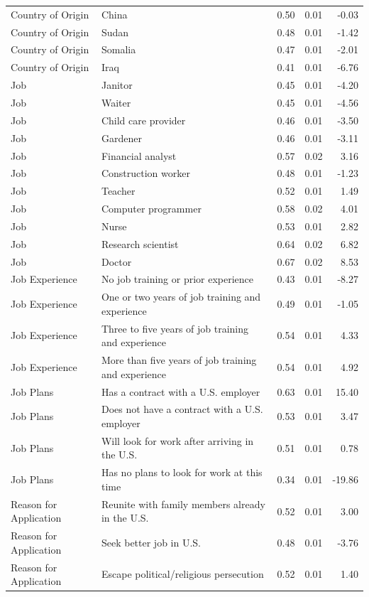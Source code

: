 \documentclass[a4paper,12pt]{article}\usepackage[]{graphicx}\usepackage[]{color}
\begin{document}
\begin{table}[ht]
\begin{tabular}{lp{3in}rrr}
  Country of Origin & China & 0.50 & 0.01 & -0.03 \\ 
  Country of Origin & Sudan & 0.48 & 0.01 & -1.42 \\ 
  Country of Origin & Somalia & 0.47 & 0.01 & -2.01 \\ 
  Country of Origin & Iraq & 0.41 & 0.01 & -6.76 \\ 
  Job & Janitor & 0.45 & 0.01 & -4.20 \\ 
  Job & Waiter & 0.45 & 0.01 & -4.56 \\ 
  Job & Child care provider & 0.46 & 0.01 & -3.50 \\ 
  Job & Gardener & 0.46 & 0.01 & -3.11 \\ 
  Job & Financial analyst & 0.57 & 0.02 & 3.16 \\ 
  Job & Construction worker & 0.48 & 0.01 & -1.23 \\ 
  Job & Teacher & 0.52 & 0.01 & 1.49 \\ 
  Job & Computer programmer & 0.58 & 0.02 & 4.01 \\ 
  Job & Nurse & 0.53 & 0.01 & 2.82 \\ 
  Job & Research scientist & 0.64 & 0.02 & 6.82 \\ 
  Job & Doctor & 0.67 & 0.02 & 8.53 \\ 
  Job Experience & No job training or prior experience & 0.43 & 0.01 & -8.27 \\ 
  Job Experience & One or two years of job training and experience & 0.49 & 0.01 & -1.05 \\ 
  Job Experience & Three to five years of job training and experience & 0.54 & 0.01 & 4.33 \\ 
  Job Experience & More than five years of job training and experience & 0.54 & 0.01 & 4.92 \\ 
  Job Plans & Has a contract with a U.S. employer & 0.63 & 0.01 & 15.40 \\ 
  Job Plans & Does not have a contract with a U.S. employer & 0.53 & 0.01 & 3.47 \\ 
  Job Plans & Will look for work after arriving in the U.S. & 0.51 & 0.01 & 0.78 \\ 
  Job Plans & Has no plans to look for work at this time & 0.34 & 0.01 & -19.86 \\ 
  Reason for Application & Reunite with family members already in the U.S. & 0.52 & 0.01 & 3.00 \\ 
  Reason for Application & Seek better job in U.S. & 0.48 & 0.01 & -3.76 \\ 
  Reason for Application & Escape political/religious persecution & 0.52 & 0.01 & 1.40 \\ 

\end{tabular}
\end{table}
\end{document}
